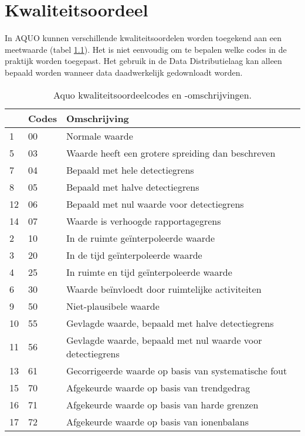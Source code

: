\documentclass[
]{book}
\begin{document}
\hypertarget{kwaliteitsoordeel}{%
\chapter{Kwaliteitsoordeel}\label{kwaliteitsoordeel}}

In AQUO kunnen verschillende kwaliteitsoordelen worden toegekend aan een meetwaarde (tabel \ref{tab:aquoKwaliteitsoordeel}). Het is niet eenvoudig om te bepalen welke codes in de praktijk worden toegepast. Het gebruik in de Data Distributielaag kan alleen bepaald worden wanneer data daadwerkelijk gedownloadt worden.

\begin{table}

\caption{\label{tab:aquoKwaliteitsoordeel}Aquo kwaliteitsoordeelcodes en -omschrijvingen.}
\centering
\begin{tabular}[t]{l|l|l}
\hline
  & Codes & Omschrijving\\
\hline
1 & 00 & Normale waarde\\
\hline
5 & 03 & Waarde heeft een grotere spreiding dan beschreven\\
\hline
7 & 04 & Bepaald met hele detectiegrens\\
\hline
8 & 05 & Bepaald met halve detectiegrens\\
\hline
12 & 06 & Bepaald met nul waarde voor detectiegrens\\
\hline
14 & 07 & Waarde is verhoogde rapportagegrens\\
\hline
2 & 10 & In de ruimte geïnterpoleerde waarde\\
\hline
3 & 20 & In de tijd geïnterpoleerde waarde\\
\hline
4 & 25 & In ruimte en tijd geïnterpoleerde waarde\\
\hline
6 & 30 & Waarde beïnvloedt door ruimtelijke activiteiten\\
\hline
9 & 50 & Niet-plausibele waarde\\
\hline
10 & 55 & Gevlagde waarde, bepaald met halve detectiegrens\\
\hline
11 & 56 & Gevlagde waarde, bepaald met nul waarde voor detectiegrens\\
\hline
13 & 61 & Gecorrigeerde waarde op basis van systematische fout\\
\hline
15 & 70 & Afgekeurde waarde op basis van trendgedrag\\
\hline
16 & 71 & Afgekeurde waarde op basis van harde grenzen\\
\hline
17 & 72 & Afgekeurde waarde op basis van ionenbalans\\

\end{tabular}
\end{table}
\end{document}
